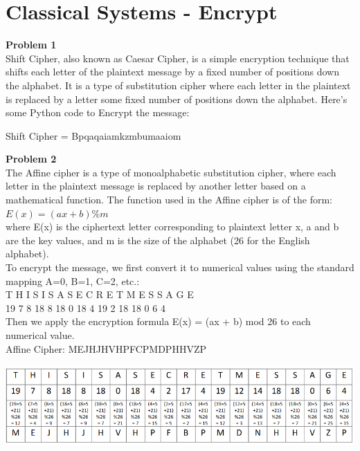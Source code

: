 \documentclass[a4paper, 11pt]{article}
\newenvironment{problem}[2][Problem]
    { \begin{mdframed}[backgroundcolor=gray!20] \textbf{#1 #2} \\}
    {  \end{mdframed}}
\begin{document}
\section*{Classical Systems - Encrypt}
\begin{problem}{1}
Shift Cipher, also known as Caesar Cipher, is a simple encryption technique that shifts each letter of the plaintext message by a fixed number of positions down the alphabet. It is a type of substitution cipher where each letter in the plaintext is replaced by a letter some fixed number of positions down the alphabet.
Here's some Python code to Encrypt the message:

Shift Cipher = Bpqaqaiamkzmbumaaiom

\end{problem}
\begin{problem}{2}
The Affine cipher is a type of monoalphabetic substitution cipher, where each letter in the plaintext message is replaced by another letter based on a mathematical function. The function used in the Affine cipher is of the form:\\
$E(x) = (ax + b) \% m$\\
where E(x) is the ciphertext letter corresponding to plaintext letter x, a and b are the key values, and m is the size of the alphabet (26 for the English alphabet).\\
To encrypt the message, we first convert it to numerical values using the standard mapping A=0, B=1, C=2, etc.:\\
T H I S I S A S E C R E T M E S S A G E\\
19 7 8 18 8 18 0 18 4 19 2 18 18 0 6 4\\
Then we apply the encryption formula E(x) = (ax + b) mod 26 to each numerical value.\\
Affine Cipher: MEJHJHVHPFCPMDPHHVZP
\end{problem}
\includegraphics[scale=0.78]{q3_1.png}
\end{document}

